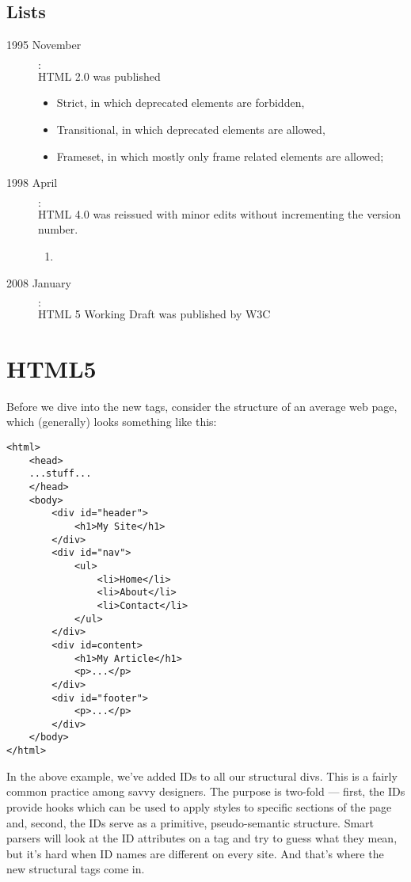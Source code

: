 \documentclass[12pt,a4paper]{report}
\begin{document}
\section{Lists}
\begin{description}
 \item[1995 November]$:$ \\HTML 2.0 was published
  \begin{itemize}
   \item Strict, in which deprecated elements are forbidden,
   \item Transitional, in which deprecated elements are allowed,
   \item Frameset, in which mostly only frame related elements are allowed;
  \end{itemize}
 \item[1998 April]$:$ \\HTML 4.0 was reissued with minor edits without incrementing the version number.
  \begin{enumerate}
  \item 
  \end{enumerate}
 \item[2008 January]$:$ \\HTML 5 Working Draft was published by W3C
 \end{description}

\chapter{HTML5}
Before we dive into the new tags, consider the structure of an average web page, which (generally) looks something like this:
\begin{verbatim}
<html>
    <head>
    ...stuff...
    </head>
    <body>
        <div id="header">
            <h1>My Site</h1>
        </div>
        <div id="nav">
            <ul>
                <li>Home</li>
                <li>About</li>
                <li>Contact</li>
            </ul>
        </div>
        <div id=content>
            <h1>My Article</h1>
            <p>...</p>
        </div>
        <div id="footer">
            <p>...</p>
        </div>
    </body>
</html>\end{verbatim} 
In the above example, we’ve added IDs to all our structural divs. This is a fairly common practice among savvy designers. The purpose is two-fold — first, the IDs provide hooks which can be used to apply styles to specific sections of the page and, second, the IDs serve as a primitive, pseudo-semantic structure. Smart parsers will look at the ID attributes on a tag and try to guess what they mean, but it’s hard when ID names are different on every site.
And that’s where the new structural tags come in.
\end{document}
